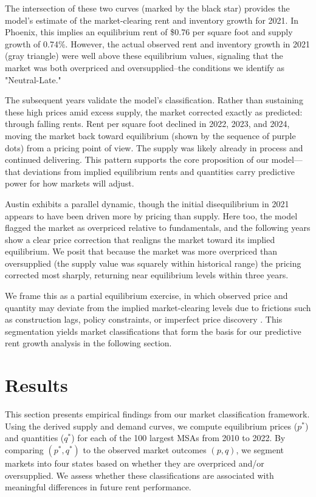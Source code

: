\documentclass[APA,Times1COL]{WileyNJDv5} %
\begin{document}
The intersection of these two curves (marked by the black star) provides the model’s estimate of the market-clearing rent and inventory growth for 2021. In Phoenix, this implies an equilibrium rent of \$0.76 per square foot and supply growth of 0.74\%. However, the actual observed rent and inventory growth in 2021 (gray triangle) were well above these equilibrium values, signaling that the market was both overpriced and oversupplied--the conditions we identify as "Neutral-Late."

The subsequent years validate the model’s classification. Rather than sustaining these high prices amid excess supply, the market corrected exactly as predicted: through falling rents. Rent per square foot declined in 2022, 2023, and 2024, moving the market back toward equilibrium (shown by the sequence of purple dots) from a pricing point of view. The supply was likely already in process and continued delivering. This pattern supports the core proposition of our model—that deviations from implied equilibrium rents and quantities carry predictive power for how markets will adjust.

Austin exhibits a parallel dynamic, though the initial disequilibrium in 2021 appears to have been driven more by pricing than supply. Here too, the model flagged the market as overpriced relative to fundamentals, and the following years show a clear price correction that realigns the market toward its implied equilibrium. We posit that because the market was more overpriced than oversupplied (the supply value was squarely within historical range) the pricing corrected most sharply, returning near equilibrium levels within three years.




We frame this as a partial equilibrium exercise, in which observed price and quantity may deviate from the implied market-clearing levels due to frictions such as construction lags, policy constraints, or imperfect price discovery \cite{wheaton1991realestate, glaeser2019rethinking}. This segmentation yields market classifications that form the basis for our predictive rent growth analysis in the following section.

\section{Results}

This section presents empirical findings from our market classification framework. Using the derived supply and demand curves, we compute equilibrium prices (\( p^* \)) and quantities (\( q^* \)) for each of the 100 largest MSAs from 2010 to 2022. By comparing \( (p^*, q^*) \) to the observed market outcomes \( (p, q) \), we segment markets into four states based on whether they are overpriced and/or oversupplied. We assess whether these classifications are associated with meaningful differences in future rent performance.
\end{document}
